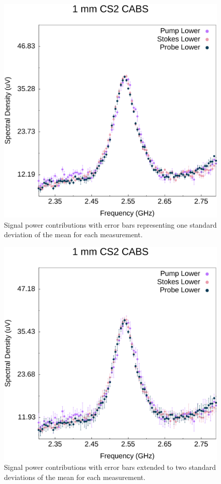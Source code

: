 \begin{figure}[ht]
  \centering
  \includegraphics[width=\textwidth]{figs/4-CABS/PSPr-Contribute-Equally.pdf}
  \caption{Signal power contributions with error bars representing one standard deviation of the mean for each measurement.}
  \label{fig:PSPr-Contribute-Equally}
\end{figure}

\begin{figure}[ht]
  \centering
  \includegraphics[width=\textwidth]{figs/4-CABS/PSPr-Contribute-Equally-2sigma.pdf}
  \caption{Signal power contributions with error bars extended to two standard deviations of the mean for each measurement.}
  \label{fig:PSPr-Contribute-Equally-2sigma}
\end{figure}

